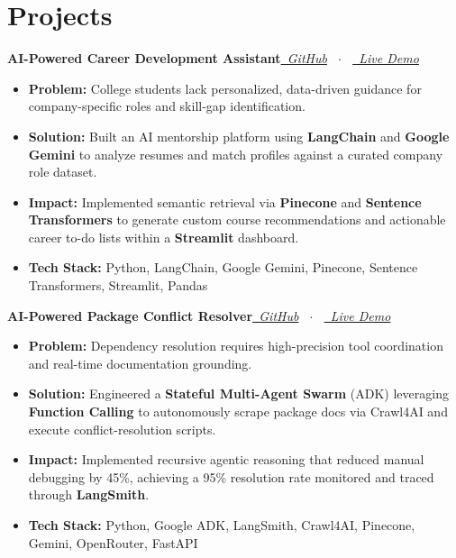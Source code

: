 \documentclass[a4paper,10pt]{article}
\newcommand{\entry}[2]{\textbf{#1}\hfill\textit{#2}\\[-1pt]}
\begin{document}
\section*{Projects}
\vspace{3pt}

\entry{AI-Powered Career Development Assistant}{\href{https://github.com/Yashwant00CR7/Personalized-Suggestion-AI}{\faGithub\ GitHub} \ $\cdot$ \ \href{https://personalized-career-development-bot.streamlit.app/}{\faExternalLink*\ Live Demo}} \vspace{-10pt}
\begin{itemize}[topsep=-5pt, itemsep=0pt, parsep=0pt]
    \item \textbf{Problem:} College students lack personalized, data-driven guidance for company-specific roles and skill-gap identification.
    \item \textbf{Solution:} Built an AI mentorship platform using \textbf{LangChain} and \textbf{Google Gemini} to analyze resumes and match profiles against a curated company role dataset.
    \item \textbf{Impact:} Implemented semantic retrieval via \textbf{Pinecone} and \textbf{Sentence Transformers} to generate custom course recommendations and actionable career to-do lists within a \textbf{Streamlit} dashboard.
    \item \textbf{Tech Stack:} Python, LangChain, Google Gemini, Pinecone, Sentence Transformers, Streamlit, Pandas
\end{itemize} \vspace{10pt}

\entry{AI-Powered Package Conflict Resolver}{\href{https://github.com/Yashwant00CR7/AI-Powered-Package-Conflict-Resolver}{\faGithub\ GitHub} \ $\cdot$ \ \href{https://huggingface.org/spaces/Yash030/AI-Package-Doctor/}{\faExternalLink*\ Live Demo}} \vspace{-10pt}
\begin{itemize}[topsep=-5pt, itemsep=0pt, parsep=0pt]
    \item \textbf{Problem:} Dependency resolution requires high-precision tool coordination and real-time documentation grounding.
    \item \textbf{Solution:} Engineered a \textbf{Stateful Multi-Agent Swarm} (ADK) leveraging \textbf{Function Calling} to autonomously scrape package docs via Crawl4AI and execute conflict-resolution scripts.
    \item \textbf{Impact:} Implemented recursive agentic reasoning that reduced manual debugging by 45\%, achieving a 95\% resolution rate monitored and traced through \textbf{LangSmith}.
    \item \textbf{Tech Stack:} Python, Google ADK, LangSmith, Crawl4AI, Pinecone, Gemini, OpenRouter, FastAPI
\end{itemize} \vspace{10pt}
\end{document}
